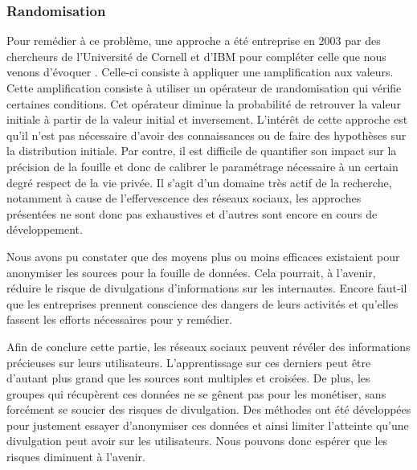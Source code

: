 \subsubsection{Randomisation}
Pour remédier à ce problème, une approche a été entreprise en 2003 par des chercheurs de l'Université de Cornell et d'IBM pour compléter celle que nous venons d'évoquer \cite{privacyDM}. Celle-ci consiste à appliquer une \i{amplification} aux valeurs. Cette amplification consiste à utiliser un opérateur de \i{randomisation} qui vérifie certaines conditions. Cet opérateur diminue la probabilité de retrouver la valeur initiale à partir de la valeur initial et inversement.
L'intérêt de cette approche est qu'il n'est pas nécessaire d'avoir des connaissances ou de faire des hypothèses sur la distribution initiale. Par contre, il est difficile de quantifier son impact sur la précision de la fouille et donc de calibrer le paramétrage nécessaire à un certain degré respect de la vie privée.
Il s'agit d'un domaine très actif de la recherche, notamment à cause de l'effervescence des réseaux sociaux, les approches présentées ne sont donc pas exhaustives et d'autres sont encore en cours de développement.

Nous avons pu constater que des moyens plus ou moins efficaces existaient pour anonymiser les sources pour la fouille de données. Cela pourrait, à l'avenir, réduire le risque de divulgations d'informations sur les internautes. Encore faut-il que les entreprises prennent conscience des dangers de leurs activités et qu'elles fassent les efforts nécessaires pour y remédier.

Afin de conclure cette partie, les réseaux sociaux peuvent révéler des informations précieuses sur leurs utilisateurs. L'apprentissage sur ces derniers peut être d'autant plus grand que les sources sont multiples et croisées. De plus, les groupes qui récupèrent ces données ne se gênent pas pour les monétiser, sans forcément se soucier des risques de divulgation.
Des méthodes ont été développées pour justement essayer d'anonymiser ces données et ainsi limiter l'atteinte qu'une divulgation peut avoir sur les utilisateurs. Nous pouvons donc espérer que les risques diminuent à l'avenir.
